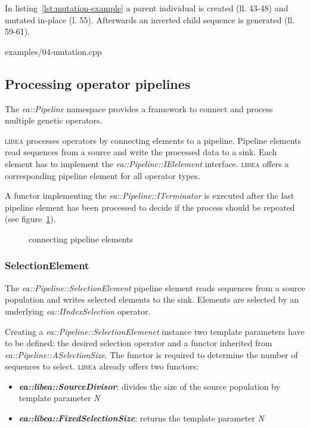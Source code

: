 \documentclass[a4paper]{article}
\begin{document}
In listing~\ref{lst:mutation-example} a parent individual is created (ll. 43-48) and mutated in-place (l. 55). Afterwards an inverted child sequence is generated (ll. 59-61).

\begin{lstinputlisting}[caption=mutation operators,label=lst:mutation-example]{examples/04-mutation.cpp}
\end{lstinputlisting}

\subsection{Processing operator pipelines}

The \textit{ea::Pipeline} namespace provides a framework to connect and process multiple genetic operators.

\textsc{libea} processes operators by connecting elements to a pipeline. Pipeline elements read sequences from a source and write the processed data to a sink. Each element has to implement the \textit{ea::Pipeline::IElelement} interface. \textsc{libea} offers a corresponding pipeline element for all operator types.

A functor implementing the \textit{ea::Pipeline::ITerminator} is executed after the last pipeline element has been processed to decide if the process should be repeated (see figure~\ref{fig:pipeline}).

\begin{figure}[h]
\caption{connecting pipeline elements}
\label{fig:pipeline}
{

}
\end{figure}

\subsubsection*{SelectionElement}

The \textit{ea::Pipeline::SelectionElement} pipeline element reads sequences from a source population and writes selected elements to the sink. Elements are selected by an underlying \textit{ea::IIndexSelection} operator.

Creating a \textit{ea::Pipeline::SelectionElemenet} instance two template parameters have to be defined: the desired selection operator and a functor inherited from \textit{ea::Pipeline::ASelectionSize}. The functor is required to determine the number of sequences to select. \textsc{libea} already offers two functors:

\begin{itemize}
	\item \textbf{\textit{ea::libea::SourceDivisor}}: divides the size of the source population by template parameter \textit{N}
	\item \textbf{\textit{ea::libea::FixedSelectionSize}}: returns the template parameter \textit{N}
\end{itemize}
\end{document}
